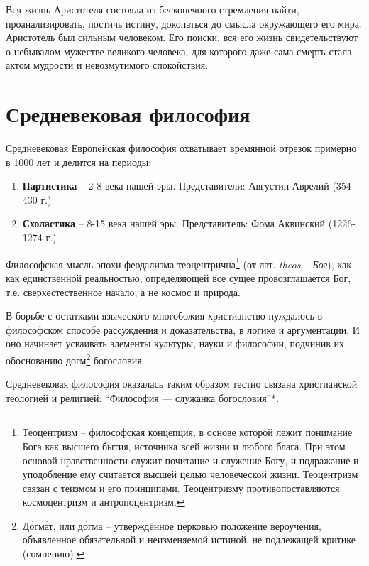 \documentclass[
]{article}
\providecommand{\tightlist}{%
  \setlength{\itemsep}{0pt}\setlength{\parskip}{0pt}}
\begin{document}
Вся жизнь Аристотеля состояла из бесконечного стремления найти,
проанализировать, постичь истину, докопаться до смысла окружающего его
мира. Аристотель был сильным человеком. Его поиски, вся его жизнь
свидетельствуют о небывалом мужестве великого человека, для которого
даже сама смерть стала актом мудрости и невозмутимого спокойствия.

\hypertarget{ux441ux440ux435ux434ux43dux435ux432ux435ux43aux43eux432ux430ux44f-ux444ux438ux43bux43eux441ux43eux444ux438ux44f}{%
\section{Средневековая
философия}\label{ux441ux440ux435ux434ux43dux435ux432ux435ux43aux43eux432ux430ux44f-ux444ux438ux43bux43eux441ux43eux444ux438ux44f}}

Средневековая Европейская философия охватывает времянной отрезок
примерно в 1000 лет и делится на периоды:

\begin{enumerate}
\def\labelenumi{\arabic{enumi}.}
\tightlist
\item
  \textbf{Партистика} -- 2-8 века нашей эры. Представители: Августин
  Аврелий (354-430 г.)
\item
  \textbf{Схоластика} -- 8-15 века нашей эры. Представитель: Фома
  Аквинский (1226-1274 г.)
\end{enumerate}

Философская мысль эпохи феодализма теоцентрична\footnote{Теоцентризм --
  философская концепция, в основе которой лежит понимание Бога как
  высшего бытия, источника всей жизни и любого блага. При этом основой
  нравственности служит почитание и служение Богу, и подражание и
  уподобление ему считается высшей целью человеческой жизни. Теоцентризм
  связан с теизмом и его принципами. Теоцентризму противопоставляются
  космоцентризм и антропоцентризм.} (от лат. \emph{theos -- Бог}), как
как единственной реальностью, определяющей все сущее провозглашается
Бог, т.е. сверхестественное начало, а не космос и природа.

В борьбе с остатками языческого многобожия христианство нуждалось в
философском способе рассуждения и доказательства, в логике и
аргументации. И оно начинает усваивать элементы культуры, науки и
философии, подчинив их обоснованию догм\footnote{До́гма́т, или до́гма --
  утверждённое церковью положение вероучения, объявленное обязательной и
  неизменяемой истиной, не подлежащей критике (сомнению).} богословия.

Средневековая философия оказалась таким образом тестно связана
христианской теологией и религией: ``Философия --- служанка
богословия''*.
\end{document}
